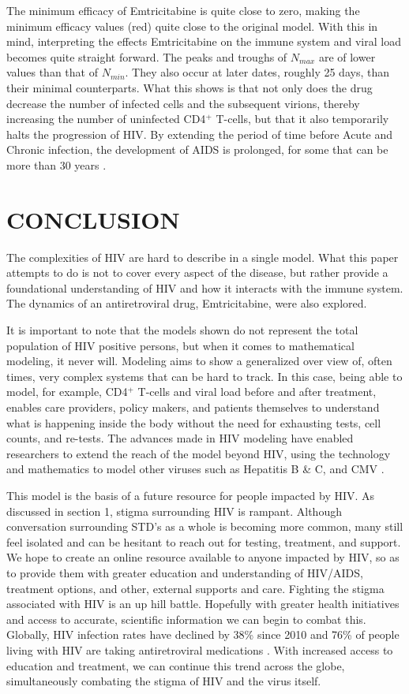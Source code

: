 \documentclass[letterpaper, 11 pt, conference]{ieeeconf}
\begin{document}
The minimum efficacy of Emtricitabine is quite close to zero, making the minimum efficacy values (red) quite close to the original model.  With this in mind, interpreting the effects Emtricitabine on the immune system and viral load becomes quite straight forward. The peaks and troughs of $N_{max}$ are of lower values than that of $N_{min}$. They also occur at later dates, roughly 25 days, than their minimal counterparts. What this shows is that not only does the drug decrease the number of infected cells and the subsequent virions, thereby increasing the number of uninfected CD4$^{+}$ T-cells, but that it also temporarily halts the progression of HIV. By extending the period of time before Acute and Chronic infection, the development of AIDS is prolonged, for some that can be more than 30 years \cite{cARVtimeline}. 

\section{CONCLUSION}
The complexities of HIV are hard to describe in a single model. What this paper attempts to do is not to cover every aspect of the disease, but rather provide a foundational understanding of HIV and how it interacts with the immune system. The dynamics of an antiretroviral drug, Emtricitabine, were also explored. 

It is important to note that the models shown do not represent the total population of HIV positive persons, but when it comes to mathematical modeling, it never will. Modeling aims to show a generalized over view of, often times, very complex systems that can be hard to track. In this case, being able to model, for example, CD4$^{+}$ T-cells and viral load before and after treatment, enables care providers, policy makers, and patients themselves to understand what is happening inside the body without the need for exhausting tests, cell counts, and re-tests. The advances made in HIV modeling have enabled researchers to extend the reach of the model beyond HIV, using the technology and mathematics to model other viruses such as Hepatitis B \& C, and CMV \cite{TIVdiagram}.

This model is the basis of a future resource for people impacted by HIV. As discussed in section 1, stigma surrounding HIV is rampant. Although conversation surrounding STD's as a whole is becoming more common, many still feel isolated and can be hesitant to reach out for testing, treatment, and support. We hope to create an online resource available to anyone impacted by HIV, so as to provide them with greater education and understanding of HIV/AIDS, treatment options, and other, external supports and care. Fighting the stigma associated with HIV is an up hill battle. Hopefully with greater health initiatives and access to accurate, scientific information we can begin to combat this. Globally, HIV infection rates have declined by 38\% since 2010 and 76\% of people living with HIV are taking antiretroviral medications \cite{UNaids}. With increased access to education and treatment, we can continue this trend across the globe, simultaneously combating the stigma of HIV and the virus itself. 
\end{document}
